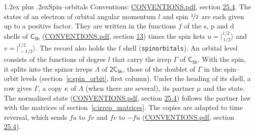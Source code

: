 \documentclass[10pt,a4paper]{article}
\makeatletter
\renewcommand\section{\@startsection{section}{1}{\z@}{-3ex plus -1ex minus -.2ex}%
  {1.2ex plus .2ex}{\normalfont\large\sffamily\bfseries\color{parttitle}}}
\numberwithin{equation}{section}
\newcommand{\grp}[1]{\mathsf{#1}}
\newcommand{\orbital}[1]{\mathrm{#1}}
\newcommand{\mult}{\kappa}
\newcommand{\intx}{\mu}
\newcommand{\jm}[2]{\bigl\lvert{}^{#1}_{\,#2}\bigr\rangle}
\makeatother
\begin{document}
\section{Spin--orbitals}\label{s:spin_orbitals}
Conventions: \href{../../CONVENTIONS.pdf}{CONVENTIONS.pdf}, section \href{../../CONVENTIONS.pdf\#conv.25.4}{25.4}.
\leavevmode\label{n:index.orbital.l}The states of an electron of orbital angular momentum $l$ and spin $\nicefrac{1}{2}$ are each given up to a positive factor. \label{n:local.spinor.uv}\label{n:local.function.f}They are written in the functions $f$ of the $\orbital{s}$, $\orbital{p}$ and $\orbital{d}$ shells of \href{../../../rotation/data/pdf/C5h.pdf}{$\grp{C_{5h}}$} (\href{../../CONVENTIONS.pdf}{CONVENTIONS.pdf}, section \href{../../../rotation/CONVENTIONS.pdf\#conv.13}{13}) times the spin kets $u = \jm{1/2}{1/2}$ and $v = \jm{1/2}{-1/2}$. The record also holds the $\orbital{f}$ shell (\texttt{spinorbitals}). An orbital level consists of the functions of degree $l$ that carry the irrep $\Gamma$ of \href{../../../rotation/data/pdf/C5h.pdf}{$\grp{C_{5h}}$}. With the spin, it splits into the spinor irreps $\Lambda$ of $\grp{2C_{5h}}$, those of the doublet of $\Gamma$ in the spin--orbit levels (section~\ref{s:spin_orbit}, first column). \label{n:head.state}Under the heading of its shell, a row gives $\Gamma$, a copy $\mult$ of $\Lambda$ (when there are several), its partner $\intx$ and the state. The normalized state (\href{../../CONVENTIONS.pdf}{CONVENTIONS.pdf}, section \href{../../CONVENTIONS.pdf\#conv.25.4}{25.4}) follows the partner law with the matrices of section~\ref{s:irrep_matrices}. The copies are adapted to time reversal, which sends $f u$ to $f v$ and $f v$ to $-f u$ (\href{../../CONVENTIONS.pdf}{CONVENTIONS.pdf}, section \href{../../CONVENTIONS.pdf\#conv.25.4}{25.4}).
\end{document}

